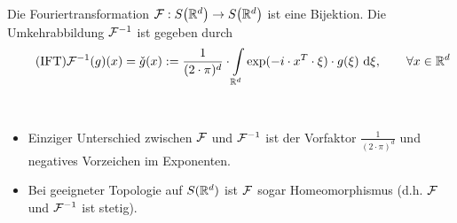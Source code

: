 \begin{theorem}\label{theorem7.4InversionDerFourierTransformation}\enter
Die Fouriertransformation $\mathcal{F}:S\big(\mathbb{R}^d\big)\to S\big(\mathbb{R}^d\big)$ ist eine Bijektion. Die Umkehrabbildung $\mathcal{F}^{-1}$ ist gegeben durch
\begin{align}\label{eqTheorem7.4}\tag{IFT}
\mathcal{F}^{-1}(g)(x)=\check{g}(x):=\frac{1}{(2\cdot\pi)^d}\cdot\int\limits_{\mathbb{R}^d}\exp(-i\cdot x^T\cdot\xi)\cdot g(\xi)\text{ d} \xi,\qquad\forall x\in\mathbb{R}^d
\end{align}
\end{theorem}

\begin{bemerkung}\
\begin{itemize}
\item Einziger Unterschied zwischen $\mathcal{F}$ und $\mathcal{F}^{-1}$ ist der Vorfaktor $\frac{1}{(2\cdot\pi)^d}$ und negatives Vorzeichen im Exponenten.
\item Bei geeigneter Topologie auf $S(\mathbb{R}^d)$ ist $\mathcal{F}$ sogar Homeomorphismus (d.h. $\mathcal{F}$ und $\mathcal{F}^{-1}$ ist stetig).
\end{itemize}
\end{bemerkung}

